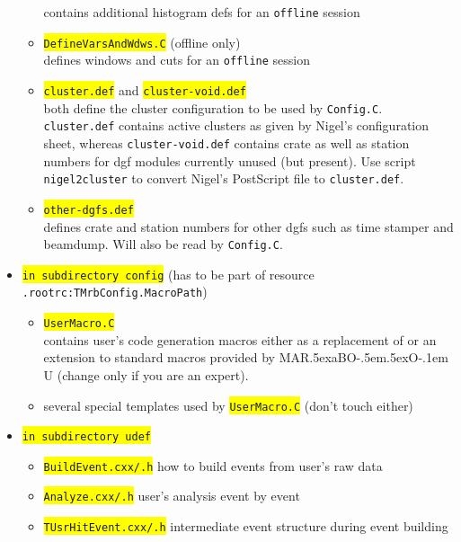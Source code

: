 \documentclass[10pt]{article}
\def\MARaBOU{MAR\lower.5ex\hbox{a}BO\kern-.5em\lower.5ex\hbox{O}\kern-.1em U}%
\newcommand{\yellow}[1]{\colorbox{yellow}{\texttt{#1}}}
\begin{document}
\begin{itemize}
\begin{itemize}
		contains additional histogram defs for an \texttt{offline} session
	\item	\yellow{DefineVarsAndWdws.C} (offline only)\\
		defines windows and cuts for an \texttt{offline} session
	\item	\yellow{cluster.def} and \yellow{cluster-void.def}\\
		both define the cluster configuration to be used by \texttt{Config.C}. \texttt{cluster.def} contains active clusters as
		given by Nigel's configuration sheet, whereas \texttt{cluster-void.def} contains crate as well
		as station numbers for dgf modules
		currently unused (but present). Use script \texttt{nigel2cluster} to convert Nigel's PostScript
		file to \texttt{cluster.def}. 
	\item	\yellow{other-dgfs.def}\\
		defines crate and station numbers for other dgfs such as time stamper and beamdump. Will also be read by \texttt{Config.C}.
	\end{itemize}
\item	\yellow{in subdirectory config} (has to be part of resource \texttt{.rootrc:TMrbConfig.MacroPath})
	\begin{itemize}
	\setlength{\rightmargin}{1em}%
	\setlength{\leftmargin}{2em}%
	\setlength{\itemsep}{0pt}%
	\setlength{\parskip}{1mm}%
	\setlength{\partopsep}{0pt}%
	\setlength{\parsep}{0pt}%
	\setlength{\topsep}{0pt}%
	\item	\yellow{UserMacro.C}\\
		contains user's code generation macros either as a replacement of or an extension to standard macros
		provided by \MARaBOU{} (change only if you are an expert).
	\item	several special templates used by \yellow{UserMacro.C} (don't touch either)
	\end{itemize}
\item	\yellow{in subdirectory udef}
	\begin{itemize}
	\setlength{\rightmargin}{1em}%
	\setlength{\leftmargin}{2em}%
	\setlength{\itemsep}{0pt}%
	\setlength{\parskip}{1mm}%
	\setlength{\partopsep}{0pt}%
	\setlength{\parsep}{0pt}%
	\setlength{\topsep}{0pt}%
	\item	\yellow{BuildEvent.cxx/.h}
		how to build events from user's raw data
	\item	\yellow{Analyze.cxx/.h}
		user's analysis event by event
	\item	\yellow{TUsrHitEvent.cxx/.h}
		intermediate event structure during event building

\end{itemize}
\end{itemize}
\end{document}
